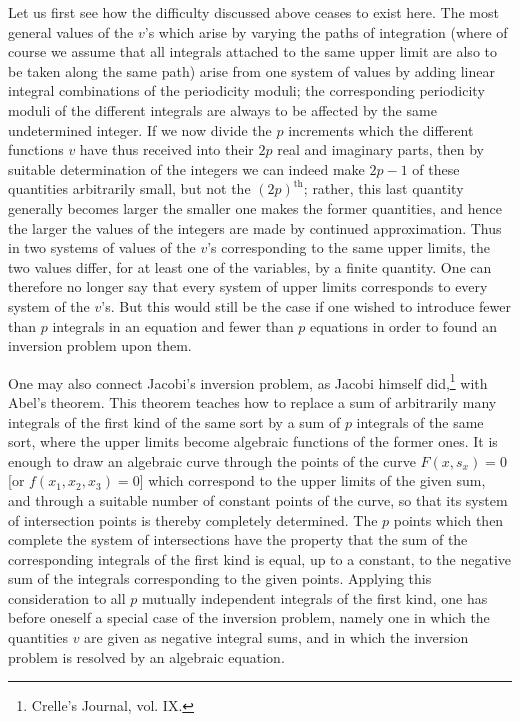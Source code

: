 \documentclass[10pt]{article}
\begin{document}
Let us first see how the difficulty discussed above ceases to exist here. The most general values of the \(v\)'s which arise by varying the paths of integration (where of course we assume that all integrals attached to the same upper limit are also to be taken along the same path) arise from one system of values by adding linear integral combinations of the periodicity moduli; the corresponding periodicity moduli of the different integrals are always to be affected by the same undetermined integer. If we now divide the \(p\) increments which the different functions \(v\) have thus received into their \(2p\) real and imaginary parts, then by suitable determination of the integers we can indeed make \(2p-1\) of these quantities arbitrarily small, but not the \((2p)^{\mathrm{th}}\); rather, this last quantity generally becomes larger the smaller one makes the former quantities, and hence the larger the values of the integers are made by continued approximation. Thus in two systems of values of the \(v\)'s corresponding to the same upper limits, the two values differ, for at least one of the variables, by a finite quantity. One can therefore no longer say that every system of upper limits corresponds to every system of the \(v\)'s. But this would still be the case if one wished to introduce fewer than \(p\) integrals in an equation and fewer than \(p\) equations in order to found an inversion problem upon them.

One may also connect Jacobi's inversion problem, as Jacobi himself did,\footnote{Crelle's Journal, vol. IX.} with Abel's theorem. This theorem teaches how to replace a sum of arbitrarily many integrals of the first kind of the same sort by a sum of \(p\) integrals of the same sort, where the upper limits become algebraic functions of the former ones. It is enough to draw an algebraic curve through the points of the curve \(F(x,s_x)=0\) [or \(f(x_1,x_2,x_3)=0\)] which correspond to the upper limits of the given sum, and through a suitable number of constant points of the curve, so that its system of intersection points is thereby completely determined. The \(p\) points which then complete the system of intersections have the property that the sum of the corresponding integrals of the first kind is equal, up to a constant, to the negative sum of the integrals corresponding to the given points. Applying this consideration to all \(p\) mutually independent integrals of the first kind, one has before oneself a special case of the inversion problem, namely one in which the quantities \(v\) are given as negative integral sums, and in which the inversion problem is resolved by an algebraic equation.
\end{document}
